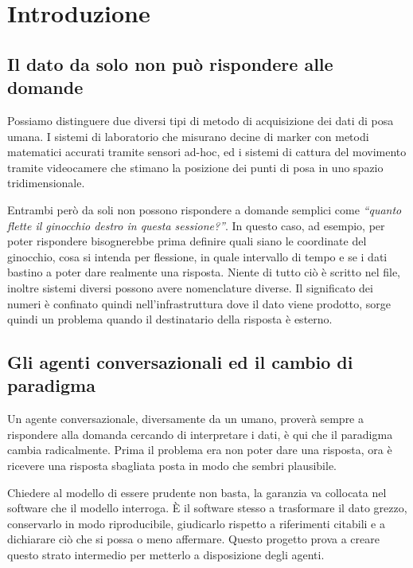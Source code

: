 \chapter{Introduzione}
\label{chap:introduzione}

\section{Il dato da solo non può rispondere alle domande}
\label{sec:ch1:contesto}

Possiamo distinguere due diversi tipi di metodo di acquisizione dei dati di posa umana. 
I sistemi di laboratorio che misurano decine di marker con metodi matematici accurati tramite sensori ad-hoc, ed i 
sistemi di cattura del movimento tramite videocamere che stimano la posizione dei punti di posa in uno spazio tridimensionale.

Entrambi però da soli non possono rispondere a domande semplici come \emph{``quanto flette il
ginocchio destro in questa sessione?''}. In questo caso, ad esempio, per poter rispondere bisognerebbe 
prima definire quali siano le coordinate del ginocchio, cosa si intenda per flessione, in quale intervallo di tempo e se i dati 
bastino a poter dare realmente una risposta. Niente di tutto ciò è scritto nel file, inoltre sistemi diversi possono avere 
nomenclature diverse. Il significato dei numeri è confinato quindi nell'infrastruttura dove il dato viene prodotto, sorge 
quindi un problema quando il destinatario della risposta è esterno.

\section{Gli agenti conversazionali ed il cambio di paradigma}
\label{sec:ch1:agenti}

Un agente conversazionale, diversamente da un umano, proverà sempre a rispondere alla domanda 
cercando di interpretare i dati, è qui che il paradigma cambia radicalmente. Prima il problema era non 
poter dare una risposta, ora è ricevere una risposta sbagliata posta in modo che sembri plausibile.

Chiedere al modello di essere prudente non basta, la garanzia va collocata nel
software che il modello interroga. È il software stesso a trasformare il dato grezzo, 
conservarlo in modo riproducibile, giudicarlo rispetto a riferimenti citabili e
a dichiarare ciò che si possa o meno affermare. Questo progetto prova a creare questo strato 
intermedio per metterlo a disposizione degli agenti.

